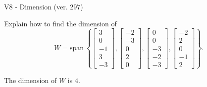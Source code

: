 \begin{exercise}
  \begin{exerciseTitle}V8 - Dimension (ver. 297)\end{exerciseTitle}
  \begin{exerciseStatement}
    Explain how to find the dimension of 
\[W=\mathrm{span}\ \left\{\left[\begin{array}{r}
3 \\
0 \\
-1 \\
3 \\
-3
\end{array}\right] , \left[\begin{array}{r}
-2 \\
-3 \\
0 \\
2 \\
0
\end{array}\right] , \left[\begin{array}{r}
0 \\
0 \\
-3 \\
-2 \\
-3
\end{array}\right] , \left[\begin{array}{r}
-2 \\
2 \\
0 \\
-1 \\
2
\end{array}\right]\right\}.\]



  \end{exerciseStatement}
  \begin{exerciseAnswer}
   The dimension of \(W\) is  \(4\).
  


  \end{exerciseAnswer}
\end{exercise}